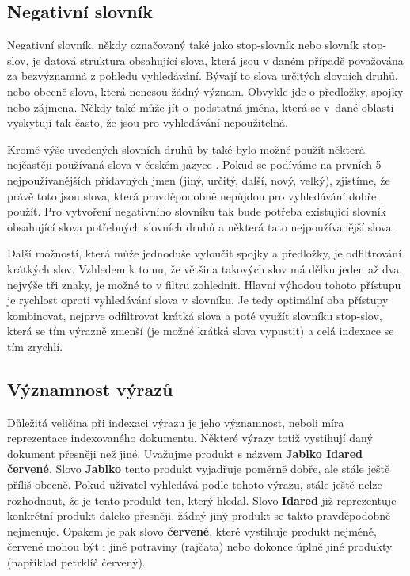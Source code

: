 \documentclass[FM,DP]{tulthesis}
\begin{document}
\subsection{Negativní slovník}

Negativní slovník, někdy označovaný také jako stop-slovník nebo slovník stop-slov, 
je datová struktura obsahující slova, která jsou v daném případě považována za bezvýznamná
z pohledu vyhledávání. Bývají to slova určitých slovních druhů, nebo obecně slova, která 
nenesou žádný význam. Obvykle jde o předložky, spojky nebo zájmena. Někdy také může jít 
o~podstatná jména, která se v~dané oblasti vyskytují tak často, že jsou pro vyhledávání nepoužitelná.

Kromě výše uvedených slovních druhů by také bylo možné použít některá nejčastěji používaná
slova v českém jazyce \cite{nejpouzivanejsi-slova} . Pokud se podíváme na prvních 5 nejpoužívanějších 
přídavných jmen (jiný, určitý, další, nový, velký), zjistíme, že právě toto jsou slova, 
která pravděpodobně nepůjdou pro vyhledávání dobře použít. Pro vytvoření negativního slovníku 
tak bude potřeba existující slovník obsahující slova potřebných slovních druhů a některá tato 
nejpoužívanější slova.

Další možností, která může jednoduše vyloučit spojky a předložky, je odfiltrování krátkých
slov. Vzhledem k tomu, že většina takových slov má dělku jeden až dva, nejvýše tři znaky, 
je možné to v filtru zohlednit. Hlavní výhodou tohoto přístupu je rychlost oproti vyhledávání
slova v slovníku. Je tedy optimální oba přístupy kombinovat, nejprve odfiltrovat krátká slova
a poté využít slovníku stop-slov, která se tím výrazně zmenší (je možné krátká slova vypustit)
a celá indexace se tím zrychlí.

\subsection{Významnost výrazů}

Důležitá veličina při indexaci výrazu je jeho významnost, neboli míra reprezentace indexovaného
dokumentu. Některé výrazy totiž vystihují daný dokument přesněji než jiné. Uvažujme produkt
s názvem \textbf{Jablko Idared červené}. Slovo \textbf{Jablko} tento produkt vyjadřuje poměrně dobře, 
ale stále ještě příliš obecně. Pokud uživatel vyhledává podle tohoto výrazu, stále ještě nelze 
rozhodnout, že je tento produkt ten, který hledal. Slovo \textbf{Idared} již reprezentuje konkrétní
produkt daleko přesněji, žádný jiný produkt se takto pravděpodobně nejmenuje. Opakem je pak
slovo \textbf{červené}, které vystihuje produkt nejméně, červené mohou být i jiné potraviny (rajčata)
nebo dokonce úplně jiné produkty (například petrklíč červený). 
\end{document}
